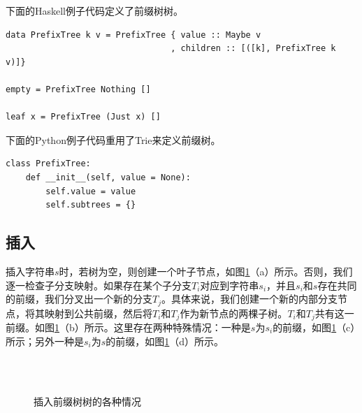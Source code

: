 \documentclass[b5paper]{ctexart}
\begin{document}
下面的Haskell例子代码定义了前缀树树。

\lstset{language=Haskell}
\begin{lstlisting}[style=Haskell]
data PrefixTree k v = PrefixTree { value :: Maybe v
                                 , children :: [([k], PrefixTree k v)]}

empty = PrefixTree Nothing []

leaf x = PrefixTree (Just x) []
\end{lstlisting}

下面的Python例子代码重用了Trie来定义前缀树。

\lstset{language=Python}
\begin{lstlisting}
class PrefixTree:
    def __init__(self, value = None):
        self.value = value
        self.subtrees = {}
\end{lstlisting}

\subsection{插入}

插入字符串$s$时，若树为空，则创建一个叶子节点，如图\ref{fig:patricia-insert}（a）所示。否则，我们逐一检查子分支映射。如果存在某个子分支$T_i$对应到字符串$s_i$，并且$s_i$和$s$存在共同的前缀，我们分叉出一个新的分支$T_j$。具体来说，我们创建一个新的内部分支节点，将其映射到公共前缀，然后将$T_i$和$T_j$作为新节点的两棵子树。$T_i$和$T_j$共有这一前缀。如图\ref{fig:patricia-insert}（b）所示。这里存在两种特殊情况：一种是$s$为$s_i$的前缀，如图\ref{fig:patricia-insert}（c）所示；另外一种是$s_i$为$s$的前缀，如图\ref{fig:patricia-insert}（d）所示。

\begin{figure}[htbp]
  \centering
  \hspace{.1\textwidth}
   \\
   \\
  \caption{插入前缀树树的各种情况}
  \label{fig:patricia-insert}
\end{figure}
\end{document}
